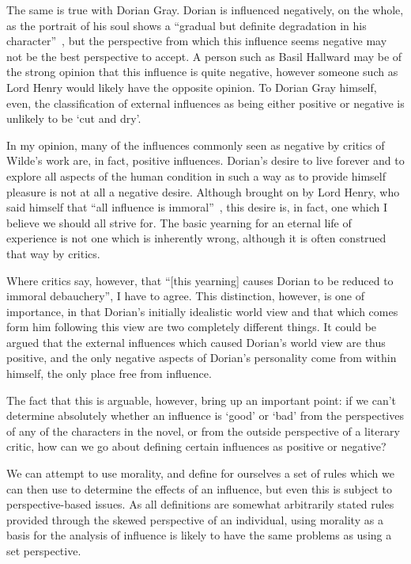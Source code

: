 \documentclass[12pt]{article}
\begin{document}
The same is true with Dorian Gray. Dorian is influenced negatively, on the whole, as the portrait of his soul shows a ``gradual but definite degradation in his character''~\cite[516]{wainwright}, but the perspective from which this influence seems negative may not be the best perspective to accept. A person such as Basil Hallward may be of the strong opinion that this influence is quite negative, however someone such as Lord Henry would likely have the opposite opinion. To Dorian Gray himself, even, the classification of external influences as being either positive or negative is unlikely to be `cut and dry'.

In my opinion, many of the influences commonly seen as negative by critics of Wilde's work are, in fact, positive influences. Dorian's desire to live forever and to explore all aspects of the human condition in such a way as to provide himself pleasure is not at all a negative desire. Although brought on by Lord Henry, who said himself that ``all influence is immoral''~\cite[23]{wilde}, this desire is, in fact, one which I believe we should all strive for. The basic yearning for an eternal life of experience is not one which is inherently wrong, although it is often construed that way by critics.

Where critics say, however, that ``[this yearning] causes Dorian to be reduced to immoral debauchery'', I have to agree. This distinction, however, is one of importance, in that Dorian's initially idealistic world view and that which comes form him following this view are two completely different things. It could be argued that the external influences which caused Dorian's world view are thus positive, and the only negative aspects of Dorian's personality come from within himself, the only place free from influence.

The fact that this is arguable, however, bring up an important point: if we can't determine absolutely whether an influence is `good' or `bad' from the perspectives of any of the characters in the novel, or from the outside perspective of a literary critic, how can we go about defining certain influences as positive or negative?

We can attempt to use morality, and define for ourselves a set of rules which we can then use to determine the effects of an influence, but even this is subject to perspective-based issues. As all definitions are somewhat arbitrarily stated rules provided through the skewed perspective of an individual, using morality as a basis for the analysis of influence is likely to have the same problems as using a set perspective.
\end{document}

